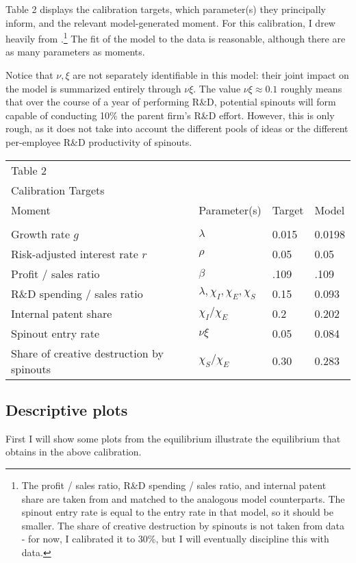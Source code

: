 \documentclass[12pt,english]{article}
\theoremstyle{remark}
\begin{document}
Table 2 displays the calibration targets, which parameter(s) they principally inform, and the relevant model-generated moment. For this calibration, I drew heavily from \cite{akcigit_growth_2018}.\footnote{The profit / sales ratio, R\&D spending / sales ratio, and internal patent share are taken from \cite{akcigit_growth_2018} and matched to the analogous model counterparts. The spinout entry rate is equal to the entry rate in that model, so it should be smaller. The share of creative destruction by spinouts is not taken from data - for now, I calibrated it to 30\%, but I will eventually discipline this with data.} The fit of the model to the data is reasonable, although there are as many parameters as moments.

Notice that $\nu,\xi$ are not separately identifiable in this model: their joint impact on the model is summarized entirely through $\nu \xi$. The value $\nu \xi \approx 0.1$ roughly means that over the course of a year of performing R\&D, potential spinouts will form capable of conducting 10\% the parent firm's R\&D effort. However, this is only rough, as it does not take into account the different pools of ideas or the different per-employee R\&D productivity of spinouts. 

\begin{table}[h]
	\centering{}%
	\begin{tabular}{llll}
		Table 2 & & &  \tabularnewline
		Calibration Targets & & &  \tabularnewline
		\hline 
		Moment & Parameter(s) & Target & Model \tabularnewline
		&  &  & \tabularnewline
		\hline 
		Growth rate $g$ & $\lambda$ & 0.015 & 0.0198 \tabularnewline
		Risk-adjusted interest rate $r$ & $\rho$ & 0.05 & 0.05 \tabularnewline
		Profit / sales ratio & $\beta$ & .109 & .109 \tabularnewline
		R\&D spending / sales ratio & $\lambda,\chi_I,\chi_E,\chi_S$ & 0.15 & 0.093
		\tabularnewline
		Internal patent share & $\chi_I / \chi_E$ & 0.2 & 0.202
		\tabularnewline
		Spinout entry rate & $\nu \xi$ & 0.05 & 0.084
		\tabularnewline
		Share of creative destruction by spinouts & $ \chi_S / \chi_E$ & 0.30 & 0.283 
	\end{tabular}
\end{table}

\subsection{Descriptive plots}

First I will show some plots from the equilibrium illustrate the equilibrium that obtains in the above calibration. 
\end{document}
